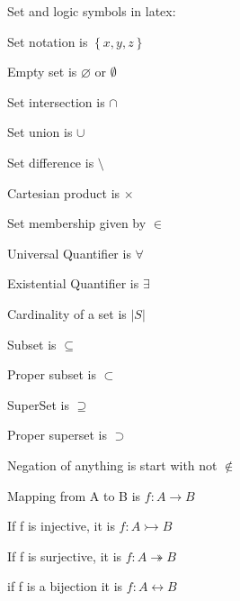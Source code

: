 \documentclass{article}
\begin{document}
Set and logic symbols in latex:

Set notation is $\left\{ {x,y,z} \right\}$

Empty set is $\varnothing$ or $\emptyset$

Set intersection is $\cap$

Set union is $\cup$

Set difference is $\setminus$

Cartesian product is $\times$

Set membership given by $\in$

Universal Quantifier is $\forall$

Existential Quantifier is $\exists$

Cardinality of a set is $\left\vert{S}\right\vert$

Subset is $\subseteq$

Proper subset is $\subset$

SuperSet is $\supseteq$

Proper superset is $\supset$

Negation of anything is start with not $\not \in$

Mapping from A to B is $f: A \to B$

If f is injective, it is $f: A \rightarrowtail B$

If f is surjective, it is $f: A \twoheadrightarrow B$

if f is a bijection it is $f: A \leftrightarrow B$
\end{document}
